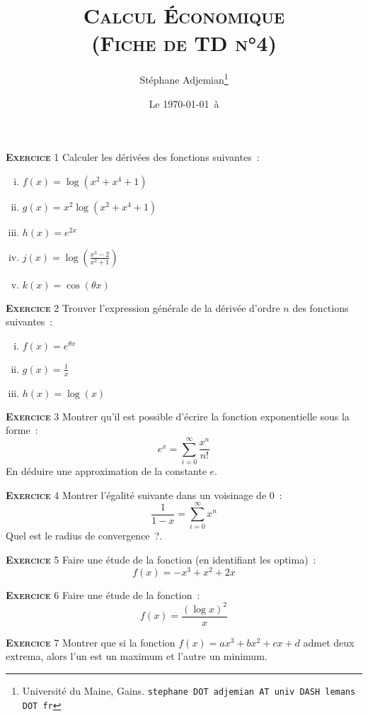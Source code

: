 \documentclass[10pt,a4paper,notitlepage]{article}
\newcommand{\exercice}[1]{\textsc{\textbf{Exercice}} #1}
\begin{document}
\title{\textsc{Calcul Économique\\ \small{(Fiche de TD n°4)}}}
\author{Stéphane Adjemian\thanks{Université du Maine, Gains. \texttt{stephane DOT adjemian AT univ DASH lemans DOT fr}}}
\date{Le \today\ à \thistime}

\maketitle

\exercice{1} Calculer les dérivées des fonctions suivantes :
\begin{enumerate}[(i)]
\item $f(x) = \log (x^2+x^4+1)$
\item $g(x) = x^2\log (x^2+x^4+1)$
\item $h(x) = e^{2x}$
\item $j(x) = \log \left(\frac{x^3-2}{x^2+1}\right)$
\item $k(x) = \cos(\theta x)$
\end{enumerate}

\bigskip

\exercice{2} Trouver l'expression générale de la dérivée d'ordre $n$ des
fonctions suivantes :
\begin{enumerate}[(i)]
\item $f(x) = e^{\theta x}$
\item $g(x) = \frac{1}{x}$
\item $h(x) = \log (x)$
\end{enumerate}

\bigskip

\exercice{3} Montrer qu'il est possible d'écrire la fonction
exponentielle sous la forme :
\[
e^{x} = \sum_{i=0}^{\infty} \frac{x^n}{n!}
\]
En déduire une approximation de la constante $e$.

\bigskip

\exercice{4} Montrer l'égalité suivante dans un voisinage de 0 :
\[
\frac{1}{1-x} = \sum_{i=0}^{\infty} x^n
\]
Quel est le radius de convergence ?.

\bigskip

\exercice{5} Faire une étude de la fonction (en identifiant les optima) :
\[
f(x) = -x^3+x^2+2x
\]

\bigskip

\exercice{6} Faire une étude de la fonction :
\[
f(x) = \frac{(\log x)^2}{x}
\]

\bigskip

\exercice{7} Montrer que si la fonction $f(x)=ax^3+bx^2+cx+d$ admet
deux extrema, alors l'un est un maximum et l'autre un minimum.
\end{document}
